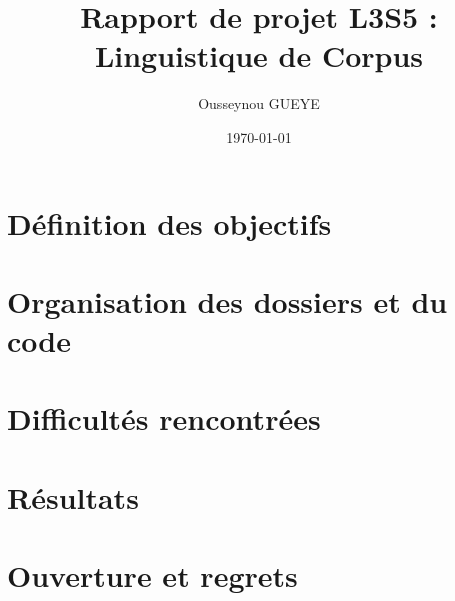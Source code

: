 \documentclass[12pt, a4paper]{report}%
\title{\textbf{Rapport de projet L3S5 : Linguistique de Corpus} }
\author{Ousseynou GUEYE}
\date{\today}
\begin{document}
\maketitle
		\begin{onehalfspace}

\tableofcontents



	\chapter{Définition des objectifs}


	\chapter{Organisation des dossiers et du code}


	\chapter{Difficultés rencontrées}


	\chapter{Résultats}


	\chapter{Ouverture et regrets}
%


	\chapter{}





\newpage

\tableofcontents


		\end{onehalfspace}
\end{document}
